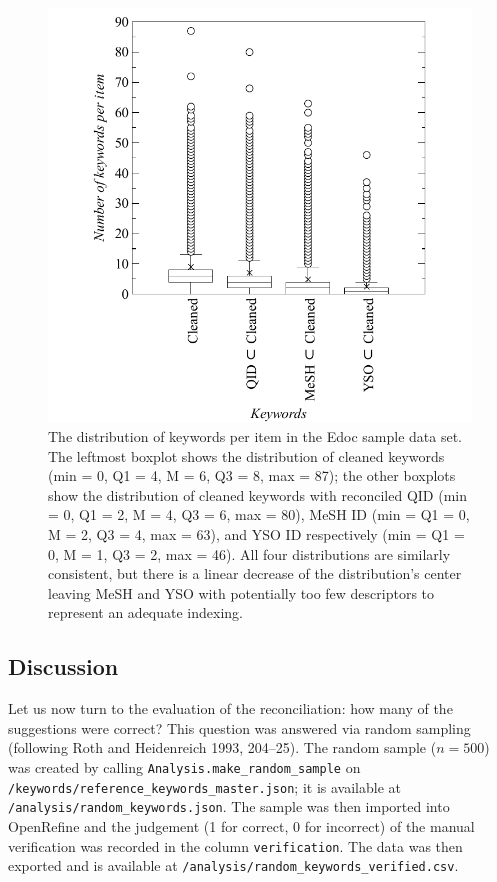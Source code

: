 \begin{figure}
\centering
\includegraphics{images/keywords_counted.pdf}
\caption{The distribution of keywords per item in the Edoc sample data
set. The leftmost boxplot shows the distribution of cleaned keywords
(min = 0, Q1 = 4, M = 6, Q3 = 8, max = 87); the other boxplots show the
distribution of cleaned keywords with reconciled QID (min = 0, Q1 = 2, M
= 4, Q3 = 6, max = 80), MeSH ID (min = Q1 = 0, M = 2, Q3 = 4, max = 63),
and YSO ID respectively (min = Q1 = 0, M = 1, Q3 = 2, max = 46). All
four distributions are similarly consistent, but there is a linear
decrease of the distribution's center leaving MeSH and YSO with
potentially too few descriptors to represent an adequate indexing.}
\end{figure}

\hypertarget{discussion}{%
\subsection{Discussion}\label{discussion}}

Let us now turn to the evaluation of the reconciliation: how many of the
suggestions were correct? This question was answered via random sampling
(following Roth and Heidenreich 1993, 204--25). The random sample
(\(n=500\)) was created by calling
\texttt{Analysis.make\_random\_sample} on
\texttt{/keywords/reference\_keywords\_master.json}; it is available at
\texttt{/analysis/random\_keywords.json}. The sample was then imported
into OpenRefine and the judgement (1 for correct, 0 for incorrect) of
the manual verification was recorded in the column
\texttt{verification}. The data was then exported and is available at
\texttt{/analysis/random\_keywords\_verified.csv}.


